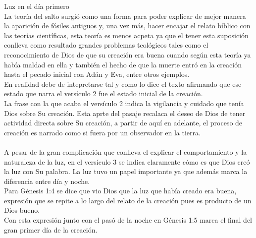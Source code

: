 \begin{section}{Luz en el día primero}
\\
La teoría del salto surgió como una forma para poder explicar de mejor manera la aparición de fósiles antiguos y, una vez más, hacer encajar el relato bíblico con las teorías científicas, esta teoría es menos acpeta ya que el tener esta suposición conlleva como resultado grandes problemas teológicos tales como el reconocimiento de Dios de que su creación era buena cuando según esta teoría ya había maldad en ella y también el hecho de que la muerte entró en la creación hasta el pecado inicial con Adán y Eva, entre otros ejemplos.\\
En realidad debe de intepretarse tal y como lo dice el texto afirmando que ese estado que narra el versículo 2 fue el estado inicial de la creación.\\
La frase con la que acaba el versículo 2 indica la vigilancia y cuidado que tenía Dios sobre Su creación. Esta aprte del pasaje recalaca el deseo de Dios de tener actividad directa sobre Su creación, a partir de aquí en adelante, el proceso de creación es narrado como si fuera por un observador en la tierra.\\
\\
A pesar de la gran complicación que conlleva el explicar el comportamiento y la naturaleza de la luz, en el versículo 3 se indica claramente cómo es que Dios creó la luz con Su palabra. La luz tuvo un papel importante ya que además marca la diferencia entre día y noche.\\
Para Génesis 1:4 se dice que vio Dios que la luz que había creado era buena, expresión que se repite a lo largo del relato de la creación pues es producto de un Dios bueno.\\
Con esta expresión junto con el pasó de la noche en Génesis 1:5 marca el final del gran primer día de la creación.
\end{section}
\newpage
